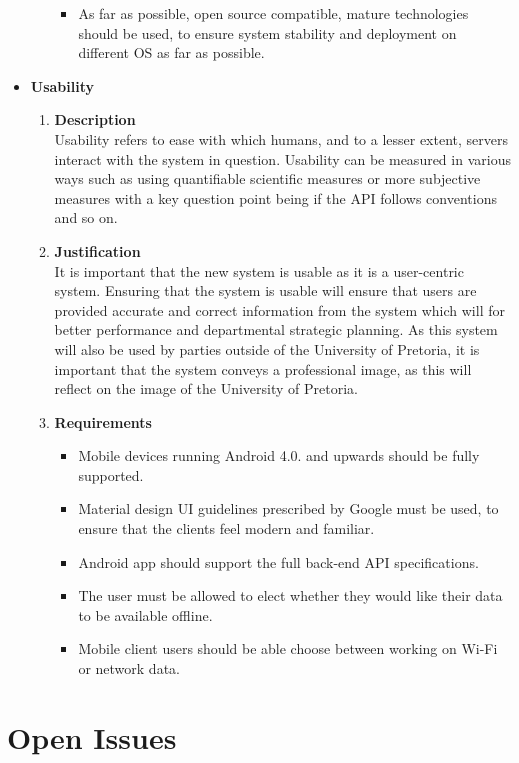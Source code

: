 \documentclass[a4paper,10pt]{article}
\begin{document}
\begin{itemize}
\begin{enumerate}
\begin{itemize}
		\item As far as possible, open source compatible, mature technologies should be used, to ensure system stability and deployment on different OS as far as possible.
	\end{itemize}
\end{enumerate}
\item \textbf {Usability}
\begin{enumerate}
\item \textbf{Description} \\
Usability refers to ease with which humans, and to a lesser extent, servers interact with the system in question. Usability can be measured in various ways such as using quantifiable scientific measures or more subjective measures with a key question point being if the API follows conventions and so on.
\item \textbf{Justification} \\
It is important that the new system is usable as it is a user-centric system. Ensuring that the system is usable will ensure that users are provided accurate and correct information from the system which will for better performance and departmental strategic planning. As this system will also be used by parties outside of the University of Pretoria, it is important that the system conveys a professional image, as this will reflect on the image of the University of Pretoria. 
\item \textbf{Requirements}
	\begin{itemize}
		\item Mobile devices running Android 4.0. and upwards should be fully supported.
		\item Material design UI guidelines prescribed by Google must be used, to ensure that the clients feel modern and familiar. 
		\item Android app should support the full back-end API specifications.
		\item The user must be allowed to elect whether they would like their data to be available offline.
		\item Mobile client users should be able choose between working on Wi-Fi  or network data. 
	\end{itemize}
\end{enumerate}
\end{itemize}
	

\clearpage
\section{Open Issues}
\end{document}
